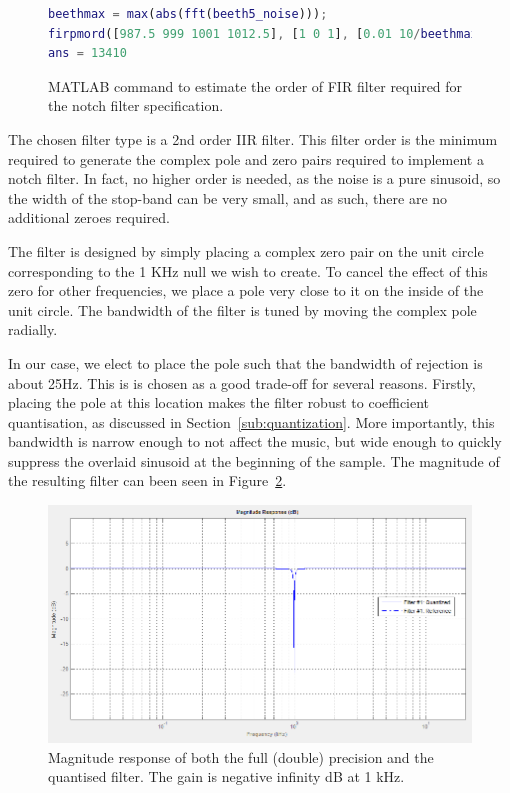 \documentclass[]{article}
\begin{document}
\begin{figure}[htbp]
	\begin{center}
		\begin{lstlisting}[language = Matlab]
beethmax = max(abs(fft(beeth5_noise)));
firpmord([987.5 999 1001 1012.5], [1 0 1], [0.01 10/beethmax 0.01], 44100)
ans = 13410
		\end{lstlisting}
	\end{center}
	\caption{MATLAB command to estimate the order of FIR filter required for the notch filter specification.}
	\label{fig:firpmord}
\end{figure}

The chosen filter type is a 2nd order IIR filter. This filter order is the minimum required to generate the complex pole and zero pairs required to implement a notch filter. In fact, no higher order is needed, as the noise is a pure sinusoid, so the width of the stop-band can be very small, and as such, there are no additional zeroes required.

The filter is designed by simply placing a complex zero pair on the unit circle corresponding to the 1 KHz null we wish to create. To cancel the effect of this zero for other frequencies, we place a pole very close to it on the inside of the unit circle. The bandwidth of the filter is tuned by moving the complex pole radially.

In our case, we elect to place the pole such that the bandwidth of rejection is about 25Hz. This is is chosen as a good trade-off for several reasons. Firstly, placing the pole at this location makes the filter robust to coefficient quantisation, as discussed in Section~\ref{sub:quantization}.
More importantly, this bandwidth is narrow enough to not affect the music, but wide enough to quickly suppress the overlaid sinusoid at the beginning of the sample.
The magnitude of the resulting filter can been seen in Figure~\ref{fig:matlabmagnitudelog}.

\begin{figure}[htbp]
	\begin{center}
		\includegraphics[width = \textwidth]{matlabmagnitudelog.PNG}
	\end{center}
	\caption{Magnitude response of both the full (double) precision and the quantised filter. The gain is negative infinity dB at 1 kHz.}
	\label{fig:matlabmagnitudelog}
\end{figure}
\end{document}
